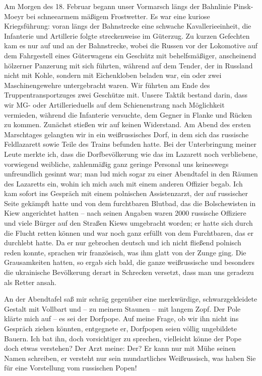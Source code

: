 Am Morgen des 18. Februar begann unser Vormarsch längs der Bahnlinie Pinsk-Moeyr bei schneearmem mäßigem Frostwetter. Es war eine kuriose Kriegsführung: voran längs der Bahnstrecke eine schwache Kavallerieeinheit, die Infanterie und Artillerie folgte streckenweise im Güterzug. Zu kurzen Gefechten kam es nur auf und an der Bahnstrecke, wobei die Russen vor der Lokomotive auf dem Fahrgestell eines Güterwagens ein Geschütz mit behelfsmäßiger, anscheinend hölzerner Panzerung mit sich führten, während auf dem Tender, der in Russland nicht mit Kohle, sondern mit Eichenkloben beladen war, ein oder zwei Maschinengewehre untergebracht waren. Wir führten am Ende des Truppentransportzuges zwei Geschütze mit. Unsere Taktik bestand darin, dass wir MG- oder Artillerieduells auf dem Schienenstrang nach Möglichkeit vermieden, während die Infanterie versuchte, dem Gegner in Flanke und Rücken zu kommen. Zunächst stießen wir auf keinen Widerstand. Am Abend des ersten Marschtages gelangten wir in ein weißrussisches Dorf, in dem sich das russische Feldlazarett sowie Teile des Trains befunden hatte. Bei der Unterbringung meiner Leute merkte ich, dass die Dorfbevölkerung wie das im Lazarett noch verbliebene, vorwiegend weibliche, zahlenmäßig ganz geringe Personal uns keineswegs unfreundlich gesinnt war; man lud mich sogar zu einer Abendtafel in den Räumen des Lazaretts ein, wohin ich mich auch mit einem anderen Offizier begab. Ich kam sofort ins Gespräch mit einem polnischen Assistenzarzt, der auf russischer Seite gekämpft hatte und von dem furchtbaren Blutbad, das die Bolschewisten in Kiew angerichtet hatten -- nach seinen Angaben waren \num{2000} russische Offiziere und viele Bürger auf den Straßen Kiews umgebracht worden; er hatte sich durch die Flucht retten können und war noch ganz erfüllt von dem Furchtbaren, das er durchlebt hatte. Da er nur gebrochen deutsch und ich nicht fließend polnisch reden konnte, sprachen wir französisch, was ihm glatt von der Zunge ging. Die Grausamkeiten hatten, so ergab sich bald, die ganze weißrussische und besonders die ukrainische Bevölkerung derart in Schrecken versetzt, dass man uns geradezu als Retter ansah.

An der Abendtafel saß mir schräg gegenüber eine merkwürdige, schwarzgekleidete Gestalt mit Vollbart und -- zu meinem Staunen -- mit langem Zopf. Der Pole klärte mich auf -- es sei der Dorfpope. Auf meine Frage, ob wir ihn nicht ins Gespräch ziehen könnten, entgegnete er, Dorfpopen seien völlig ungebildete Bauern. Ich bat ihn, doch vorsichtiger zu sprechen, vielleicht könne der Pope doch etwas verstehen? Der Arzt meine: Der? Er kann nur mit Mühe seinen Namen schreiben, er versteht nur sein mundartliches Weißrussisch, was haben Sie für eine Vorstellung vom russischen Popen!

